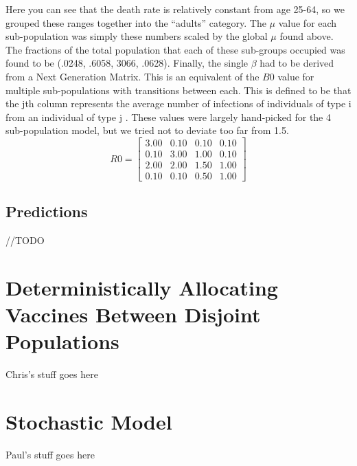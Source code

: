 \documentclass[titlepage]{article}
\begin{document}
    Here you can see that the death rate is relatively constant from age 25-64, so we grouped these ranges together into the ``adults'' category. The $\mu$ value for each sub-population was simply these numbers scaled by the global $\mu$ found above. The fractions of the total population that each of these sub-groups occupied \cite{pop} was found to be (.0248, .6058, 3066, .0628). Finally, the single $\beta$ had to be derived from a Next Generation Matrix. This is an equivalent of the $B0$ value for multiple sub-populations with transitions between each. This is defined to be that the jth column represents the average number of infections of individuals of type i from an individual of type j \cite{SIR}. These values were largely hand-picked for the 4 sub-population model, but we tried not to deviate too far from 1.5.
    \[
        R0 = 
        \begin{bmatrix}
        3.00 & 0.10 & 0.10 & 0.10 \\
        0.10 & 3.00 & 1.00 & 0.10 \\
        2.00 & 2.00 & 1.50 & 1.00 \\
        0.10 & 0.10 & 0.50 & 1.00
        \end{bmatrix}
    \]

\subsection{Predictions}
	//TODO

\section{Deterministically Allocating Vaccines Between Disjoint Populations}
	Chris's stuff goes here

\section{Stochastic Model}
	Paul's stuff goes here
\end{document}
